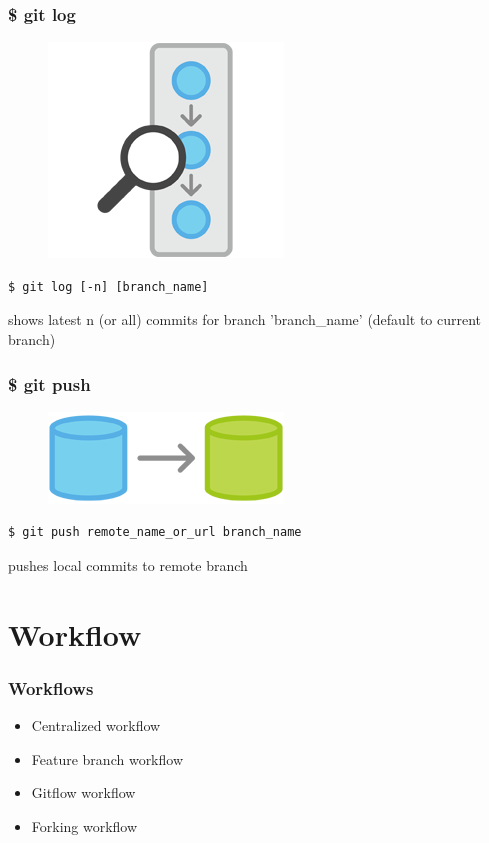 \documentclass{beamer}
\begin{document}
\begin{frame}[fragile]
    \frametitle{\$ git log}
    \begin{figure}[h!]
        \begin{center}
            \includegraphics[scale=0.7]{log.png}
        \end{center}
    \end{figure}
    \begin{verbatim}
$ git log [-n] [branch_name]
    \end{verbatim}
    shows latest n (or all) commits for branch 'branch\_name' (default to current branch)
\end{frame}

\begin{frame}[fragile]
    \frametitle{\$ git push}
    \begin{figure}[h!]
        \begin{center}
            \includegraphics[scale=0.7]{push.png}
        \end{center}
    \end{figure}
    \begin{verbatim}
$ git push remote_name_or_url branch_name
    \end{verbatim}
    pushes local commits to remote branch
\end{frame}

\section{Workflow}

\begin{frame}
    \frametitle{Workflows}
    \begin{itemize}
        \item Centralized workflow
        \item Feature branch workflow
        \item Gitflow workflow
        \item Forking workflow
    \end{itemize}
\end{frame}
\end{document}
